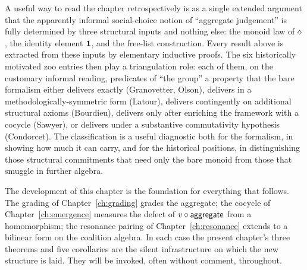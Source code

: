 A useful way to read the chapter retrospectively is as a single
extended argument that the apparently informal social-choice notion of
``aggregate judgement'' is fully determined by three structural inputs
and nothing else: the monoid law of $\mathbin{\diamond}$, the identity element
$\mathbf{1}$, and the free-list construction. Every result above is
extracted from these inputs by elementary inductive proofs. The
six historically motivated zoo entries then play a triangulation
role: each of them, on the customary informal reading, predicates of
``the group'' a property that the bare formalism either delivers
exactly (Granovetter, Olson), delivers in a methodologically-symmetric
form (Latour), delivers contingently on additional structural axioms
(Bourdieu), delivers only after enriching the framework with a
cocycle (Sawyer), or delivers under a substantive commutativity
hypothesis (Condorcet). The classification is a useful diagnostic
both for the formalism, in showing how much it can carry, and for the
historical positions, in distinguishing those structural commitments
that need only the bare monoid from those that smuggle in further
algebra.

The development of this chapter is the foundation for everything
that follows. The grading of Chapter~\ref{ch:grading} grades the
aggregate; the cocycle of Chapter~\ref{ch:emergence} measures the
defect of $v \circ \mathsf{aggregate}$ from a homomorphism; the resonance
pairing of Chapter~\ref{ch:resonance} extends to a bilinear form on
the coalition algebra. In each case the present chapter's three
theorems and five corollaries are the silent infrastructure on which
the new structure is laid. They will be invoked, often without
comment, throughout.

